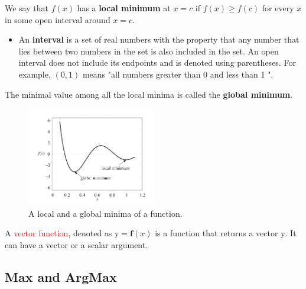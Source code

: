 \documentclass[9pt,dvipsnames]{beamer}
\begin{document}
\begin{frame}
	We say that $f(x)$ has a \textbf{local minimum} at $x=c$ if $f(x) \geq f(c)$ for every $x$ in some open interval around $x=c$.
	\begin{itemize}
		\item An \textbf{interval} is a set of real numbers with the property that any number that lies between two numbers in the set is also included in the set. An open interval does not include its endpoints and is denoted using parentheses. For example, $(0,1)$ means "all numbers greater than 0 and less than 1 ".
	\end{itemize}
 The minimal value among all the local minima is called the \textbf{global minimum}. 
 \begin{figure}
 	\centering
 	\includegraphics[width=0.5\textwidth]{imgs/notation_2}
 	\caption{A local and a global minima of a function.}
 \end{figure}
 A \textcolor{red}{vector function}, denoted as $\mathrm{y}=\boldsymbol{f}(x)$ is a function that returns a vector $\mathrm{y}$. It can have a vector or a scalar argument.
\end{frame}

\subsection{Max and ArgMax}
\end{document}
